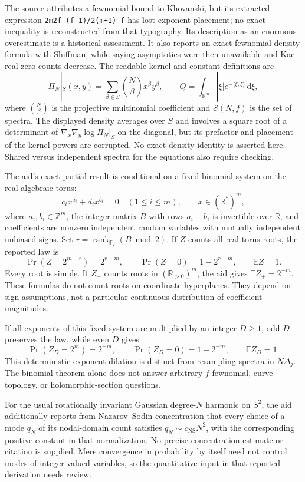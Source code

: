 \documentclass[11pt]{article}
\newcommand{\Z}{\mathbb{Z}}
\newcommand{\R}{\mathbb{R}}
\newcommand{\F}{\mathbb{F}}
\newcommand{\E}{\mathbb{E}}
\newcommand{\dd}{\,\mathrm{d}}
\begin{document}
The source attributes a fewnomial bound to Khovanski, but its extracted expression \texttt{2m2f (f-1)/2(m+1) f} has lost exponent placement; no exact inequality is reconstructed from that typography. Its description as an enormous overestimate is a historical assessment. It also reports an exact fewnomial density formula with Shiffman, while saying asymptotics were then unavailable and Kac real-zero counts decrease. The readable kernel and constant definitions are
\[
 \Pi_N|_S(x,y)=\sum_{\beta\in S}\binom{N}{\beta}x^\beta y^\beta,
 \qquad Q=\int_{\R^m}|\xi|e^{-\langle\xi,\xi\rangle}\dd\xi,
\]
where \(\binom N\beta\) is the projective multinomial coefficient and \(\mathcal S(N,f)\) is the set of spectra. The displayed density averages over \(S\) and involves a square root of a determinant of \(\nabla_x\nabla_y\log\Pi_N|_S\) on the diagonal, but its prefactor and placement of the kernel powers are corrupted. No exact density identity is asserted here. Shared versus independent spectra for the equations also require checking.

The aid's exact partial result is conditional on a fixed binomial system on the real algebraic torus:
\[
 c_i x^{a_i}+d_i x^{b_i}=0\quad(1\le i\le m),\qquad
 x\in(\R^*)^m,
\]
where \(a_i,b_i\in\Z^m\), the integer matrix \(B\) with rows \(a_i-b_i\) is invertible over \(\R\), and coefficients are nonzero independent random variables with mutually independent unbiased signs. Set \(r=\operatorname{rank}_{\F_2}(B\bmod2)\). If \(Z\) counts all real-torus roots, the reported law is
\[
 \Pr(Z=2^{m-r})=2^{r-m},\qquad
 \Pr(Z=0)=1-2^{r-m},\qquad \E Z=1.
\]
Every root is simple. If \(Z_+\) counts roots in \((\R_{>0})^m\), the aid gives \(\E Z_+=2^{-m}\). These formulas do not count roots on coordinate hyperplanes. They depend on sign assumptions, not a particular continuous distribution of coefficient magnitudes.

If all exponents of this fixed system are multiplied by an integer \(D\ge1\), odd \(D\) preserves the law, while even \(D\) gives
\[
 \Pr(Z_D=2^m)=2^{-m},\qquad\Pr(Z_D=0)=1-2^{-m},\qquad\E Z_D=1.
\]
This deterministic exponent dilation is distinct from resampling spectra in \(N\Delta_j\). The binomial theorem alone does not answer arbitrary \(f\)-fewnomial, curve-topology, or holomorphic-section questions.

For the usual rotationally invariant Gaussian degree-\(N\) harmonic on \(S^2\), the aid additionally reports from Nazarov--Sodin concentration that every choice of a mode \(q_N\) of its nodal-domain count satisfies \(q_N\sim c_{\mathrm{NS}}N^2\), with the corresponding positive constant in that normalization. No precise concentration estimate or citation is supplied. Mere convergence in probability by itself need not control modes of integer-valued variables, so the quantitative input in that reported derivation needs review.
\end{document}
